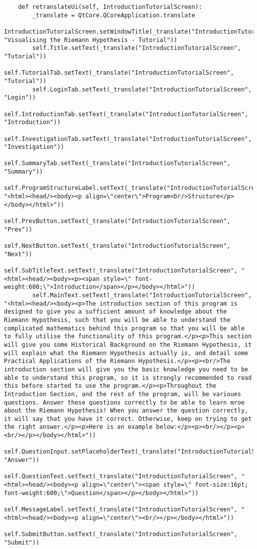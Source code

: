 \documentclass{article}
\begin{document}
\begin{lstlisting}
    def retranslateUi(self, IntroductionTutorialScreen):
        _translate = QtCore.QCoreApplication.translate
        IntroductionTutorialScreen.setWindowTitle(_translate("IntroductionTutorialScreen", "Visualising the Riemann Hypothesis - Tutorial"))
        self.Title.setText(_translate("IntroductionTutorialScreen", "Tutorial"))
        self.TutorialTab.setText(_translate("IntroductionTutorialScreen", "Tutorial"))
        self.LoginTab.setText(_translate("IntroductionTutorialScreen", "Login"))
        self.IntroductionTab.setText(_translate("IntroductionTutorialScreen", "Introduction"))
        self.InvestigationTab.setText(_translate("IntroductionTutorialScreen", "Investigation"))
        self.SummaryTab.setText(_translate("IntroductionTutorialScreen", "Summary"))
        self.ProgramStructureLabel.setText(_translate("IntroductionTutorialScreen", "<html><head/><body><p align=\"center\">Program<br/>Structure</p></body></html>"))
        self.PrevButton.setText(_translate("IntroductionTutorialScreen", "Prev"))
        self.NextButton.setText(_translate("IntroductionTutorialScreen", "Next"))
        self.SubTitleText.setText(_translate("IntroductionTutorialScreen", "<html><head/><body><p><span style=\" font-weight:600;\">Introduction</span></p></body></html>"))
        self.MainText.setText(_translate("IntroductionTutorialScreen", "<html><head/><body><p>The introduction section of this program is designed to give you a sufficient amount of knowledge about the Riemann Hypothesis, such that you will be able to understand the complicated mathematics behind this program so that you will be able to fully utilise the functionality of this program.</p><p>This section will give you some Historical Background on the Riemann Hypothesis, it will explain what the Riemann Hypothesis actually is, and detail some Practical Applications of the Riemann Hypothesis.</p><p><br/>The introduction section will give you the basic knowledge you need to be able to understand this program, so it is strongly recommended to read this before started to use the program.</p><p>Throughout the Introduction Section, and the rest of the program, will be varioues questions. Answer these questions correctly to be able to learn mroe about the Riemann Hypothesis! When you answer the question correctly, it will say that you have it correct. Otherwise, keep on trying to get the right answer.</p><p>Here is an example below:</p><p><br/></p><p><br/></p></body></html>"))
        self.QuestionInput.setPlaceholderText(_translate("IntroductionTutorialScreen", "Answer"))
        self.QuestionText.setText(_translate("IntroductionTutorialScreen", "<html><head/><body><p align=\"center\"><span style=\" font-size:16pt; font-weight:600;\">Question</span></p></body></html>"))
        self.MessageLabel.setText(_translate("IntroductionTutorialScreen", "<html><head/><body><p align=\"center\"><br/></p></body></html>"))
        self.SubmitButton.setText(_translate("IntroductionTutorialScreen", "Submit"))
\end{lstlisting}
\end{document}

